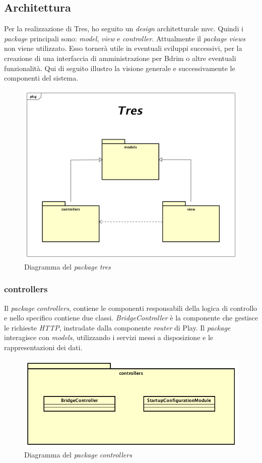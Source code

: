 \subsection{Architettura}
Per la realizzazione di Tres, ho seguito un \emph{design} architetturale \gls{mvc}. Quindi i \emph{package} principali sono: \emph{model}, \emph{view} e \emph{controller}. Attualmente il \emph{package} \emph{views} non viene utilizzato. Esso tornerà utile in eventuali sviluppi successivi, per la creazione di una interfaccia di amministrazione per Bdrim o altre eventuali funzionalità. Qui di seguito illustro la visione generale e successivamente le componenti del sistema.  
\begin{figure}[h]
\centering
\includegraphics[scale=0.35]{immagini/architetturamvc}
\caption{Diagramma del \emph{package} \emph{tres}}
\label{fig:pack-tres}
\end{figure}
\newpage
\subsubsection{controllers}
Il \emph{package} \emph{controllers}, contiene le componenti responsabili della logica di controllo e nello specifico contiene due classi. \emph{BridgeController} è la componente che gestisce le richieste \emph{HTTP}, instradate dalla componente \emph{router} di Play. Il \emph{package} interagisce con \emph{models}, utilizzando i servizi messi a disposizione e le rappresentazioni dei dati.
\begin{figure}[h]
\centering
\includegraphics[scale=0.35]{immagini/controllers}
\caption{Diagramma del \emph{package} \emph{controllers}}
\label{fig:pack-controller}
\end{figure}
